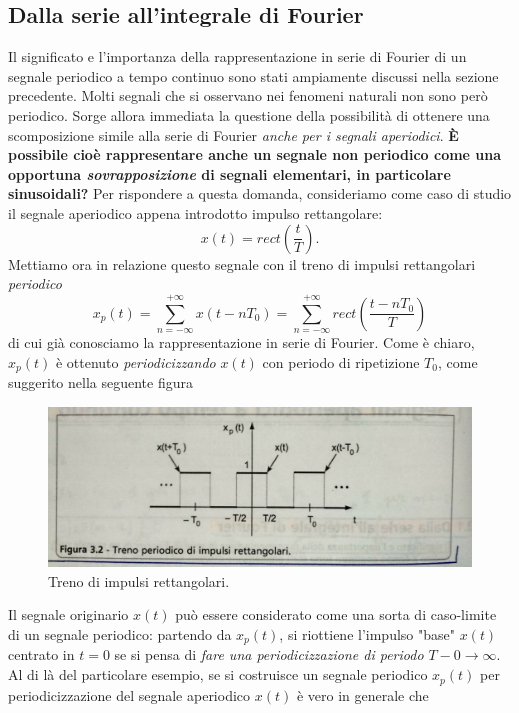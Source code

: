 \documentclass[12pt,oneside,openany]{memoir}
\numberwithin{equation}{subsection}
\begin{document}
\subsection{Dalla serie all'integrale di Fourier}
Il significato e l'importanza della rappresentazione in serie di Fourier di un segnale periodico a tempo continuo sono stati ampiamente discussi nella sezione precedente. Molti segnali che si osservano nei fenomeni naturali non sono per\`o periodico. Sorge allora immediata la questione della possibilit\`a di ottenere una scomposizione simile alla serie di Fourier \textit{anche per i segnali aperiodici}. \textbf{\`E possibile cio\`e rappresentare anche un segnale non periodico come una opportuna \textit{sovrapposizione} di segnali elementari, in particolare sinusoidali?}
\bigbreak
Per rispondere a questa domanda, consideriamo come caso di studio il segnale aperiodico appena introdotto impulso rettangolare:
\[
	x(t) = rect(\frac{t}{T}).
\]
Mettiamo ora in relazione questo segnale con il treno di impulsi rettangolari \textit{periodico}
\begin{equation}
	x_p(t) = \sum_{n = -\infty}^{+\infty} x(t - nT_0) = \sum_{n = -\infty}^{+\infty} rect\left(\frac{t - nT_0}{T}\right)
\end{equation}
di cui gi\`a conosciamo la rappresentazione in serie di Fourier. Come \`e chiaro, $x_p(t)$ \`e ottenuto \textit{periodicizzando} $x(t)$ con periodo di ripetizione $T_0$, come suggerito nella seguente figura
\begin{figure}[H]
\centering
\captionsetup{justification=centering}
\includegraphics[width=1.0\textwidth]{images/treno_di_impulsi_rettangolari_2.jpg}
\caption{Treno di impulsi rettangolari.}
\end{figure}
Il segnale originario $x(t)$ pu\`o essere considerato come una sorta di caso-limite di un segnale periodico: partendo da $x_p(t)$, si riottiene l'impulso "base" $x(t)$ centrato in $t = 0$ se si pensa di \textit{fare una periodicizzazione di periodo $T-0 \rightarrow \infty$}. Al di l\`a del particolare esempio, se si costruisce un segnale periodico $x_p(t)$ per periodicizzazione del segnale aperiodico $x(t)$ \`e vero in generale che
\end{document}
